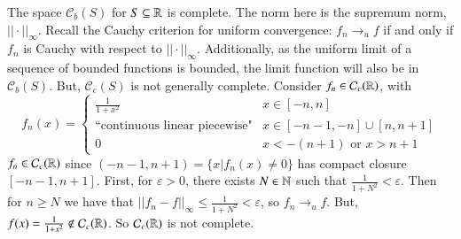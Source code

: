 \begin{example}
    The space $\mathcal{C}_b(S)$ for $S \subseteq \mathbb R$ is complete. The norm here is the supremum norm, $||\cdot||_{\infty}$. Recall the Cauchy criterion for uniform convergence: $f_n\rightarrow_uf$ if and only if $f_n$ is Cauchy with respect to $||\cdot||_{\infty}$. Additionally, as the uniform limit of a sequence of bounded functions is bounded, the limit function will also be in $\mathcal{C}_b(S)$. But, $\mathcal{C}_c(S)$ is not generally complete. Consider $f_n \in \mathcal{C}_c(\mathbb R)$, with $$f_n(x) = \left\{\begin{array}{cc}\frac{1}{1+x^2} & x \in [-n,n] \\ \text{``continuous linear piecewise"} & x \in [-n-1,-n]\cup[n,n+1] \\ 0 & x < -(n+1)\text{ or } x > n+1\end{array}\right.$$ $f_n \in \mathcal{C}_c(\mathbb R)$ since $(-n-1,n+1) = \{x\vert f_n(x) \neq 0\}$ has compact closure $[-n-1,n+1]$. First, for $\varepsilon > 0$, there exists $N \in \mathbb N$ such that $\frac{1}{1+N^2} < \varepsilon$. Then for $n \geq N$ we have that $||f_n-f||_{\infty} \leq \frac{1}{1+N^2} < \varepsilon$, so $f_n\rightarrow_uf$. But, $f(x) = \frac{1}{1+x^2} \notin \mathcal{C}_c(\mathbb R)$. So $\mathcal{C}_c(\mathbb R)$ is not complete.
\end{example}


